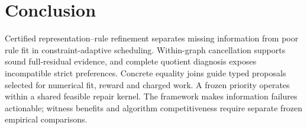 \section{Conclusion}
\label{sec:conclusion}

Certified representation--rule refinement separates missing information from
poor rule fit in constraint-adaptive scheduling. Within-graph cancellation
supports sound full-residual evidence, and complete quotient diagnosis exposes
incompatible strict preferences. Concrete equality joins guide typed proposals
selected for numerical fit, reward and charged work. A frozen priority operates
within a shared feasible repair kernel. The framework makes information
failures actionable; witness benefits and algorithm competitiveness require
separate frozen empirical comparisons.
